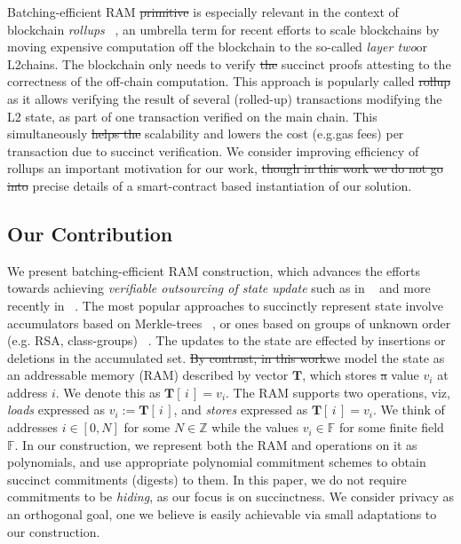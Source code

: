\documentclass[sigconf]{acmart}
\renewcommand{\vec}{\mathbf} %
\newcommand{\vecT}{\vec{T}}
\newcommand{\F}{\mathbb{F}}
\newcommand{\load}{\ensuremath{\mathsf{LD}}}
\newcommand{\store}{\ensuremath{\mathsf{STR}}}
\providecommand{\DIFaddtex}[1]{{\protect\color{blue}\uwave{#1}}} %
\providecommand{\DIFdeltex}[1]{{\protect\color{red}\sout{#1}}}                      %
\providecommand{\DIFaddbegin}{} %
\providecommand{\DIFaddend}{} %
\providecommand{\DIFdelbegin}{} %
\providecommand{\DIFdelend}{} %
\providecommand{\DIFadd}[1]{\texorpdfstring{\DIFaddtex{#1}}{#1}} %
\providecommand{\DIFdel}[1]{\texorpdfstring{\DIFdeltex{#1}}{}} %
\newcommand{\DIFscaledelfig}{0.5}
\newlength{\DIFdelgraphicswidth} %
\newlength{\DIFdelgraphicsheight} %
\newcommand{\DIFaddincludegraphics}[2][]{{\color{blue}\fbox{\DIFOincludegraphics[#1]{#2}}}} %
\newcommand{\DIFdelincludegraphics}[2][]{%
	\sbox{\DIFdelgraphicsbox}{\DIFOincludegraphics[#1]{#2}}%
	\settoboxwidth{\DIFdelgraphicswidth}{\DIFdelgraphicsbox} %
	\settoboxtotalheight{\DIFdelgraphicsheight}{\DIFdelgraphicsbox} %
	\scalebox{\DIFscaledelfig}{%
		\parbox[b]{\DIFdelgraphicswidth}{\usebox{\DIFdelgraphicsbox}\\[-\baselineskip] \rule{\DIFdelgraphicswidth}{0em}}\llap{\resizebox{\DIFdelgraphicswidth}{\DIFdelgraphicsheight}{%
				\setlength{\unitlength}{\DIFdelgraphicswidth}%
				\begin{picture}(1,1)%
					\thicklines\linethickness{2pt} %
					{\color[rgb]{1,0,0}\put(0,0){\framebox(1,1){}}}%
					{\color[rgb]{1,0,0}\put(0,0){\line( 1,1){1}}}%
					{\color[rgb]{1,0,0}\put(0,1){\line(1,-1){1}}}%
				\end{picture}%
			}\hspace*{3pt}}} %
} %
\DeclareRobustCommand{\DIFaddbegin}{\DIFOaddbegin \let\includegraphics\DIFaddincludegraphics} %
\DeclareRobustCommand{\DIFaddend}{\DIFOaddend \let\includegraphics\DIFOincludegraphics} %
\DeclareRobustCommand{\DIFdelbegin}{\DIFOdelbegin \let\includegraphics\DIFdelincludegraphics} %
\DeclareRobustCommand{\DIFdelend}{\DIFOaddend \let\includegraphics\DIFOincludegraphics} %
\begin{document}
	 \DIFaddend Batching-efficient RAM \DIFdelbegin \DIFdel{primitive }\DIFdelend is especially relevant in the context of blockchain {\em rollups} ~\cite{rollup},
	an umbrella term for recent efforts to scale blockchains by moving expensive computation off the blockchain to the so-called {\em layer two}\DIFaddbegin \DIFadd{~(}\DIFaddend or L2\DIFaddbegin \DIFadd{) }\DIFaddend chains. The blockchain only needs to verify \DIFdelbegin \DIFdel{the }\DIFdelend succinct proofs attesting to the correctness of the off-chain computation. This approach is popularly called \DIFdelbegin \DIFdel{rollup }\DIFdelend \DIFaddbegin \textit{\DIFadd{rollup}} \DIFaddend as it allows verifying the result of several (rolled-up) transactions modifying the L2 state, as part of one transaction verified on the main chain.
	This simultaneously \DIFdelbegin \DIFdel{helps the }\DIFdelend \DIFaddbegin \DIFadd{improves }\DIFaddend scalability and lowers the cost (e.g.\DIFaddbegin \DIFadd{, }\DIFaddend gas fees) per transaction due to succinct verification. We consider improving efficiency of rollups an important motivation for our work, \DIFdelbegin \DIFdel{though in this work we do not go into }\DIFdelend \DIFaddbegin \DIFadd{but avoid }\DIFaddend precise details of a smart-contract based
	instantiation of our solution.
	
	\subsection{Our Contribution}\label{subsec:ourwork} 
	We present batching-efficient RAM construction, which advances the efforts
	towards achieving {\em verifiable outsourcing of state update} such as in ~\cite{EPRINT:BFRSBW13}
	and more recently in ~\cite{USENIX:OWWB20, CCS:CFHKKO22}.
	The most popular approaches to succinctly represent
	state involve accumulators based on Merkle-trees ~\cite{C:Merkle87}, or ones based on groups of unknown order
	(e.g. RSA, class-groups) ~\cite{C:CamLys02,C:BonBunFis19,USENIX:OWWB20, CCS:CFHKKO22}.
	The updates to the state are effected by insertions or deletions in the  accumulated set.
	\DIFdelbegin \DIFdel{By contrast, in this work}\DIFdelend \DIFaddbegin \DIFadd{In this work, }\DIFaddend we
	model the state as an addressable memory (RAM) described by vector $\vecT$, which stores \DIFdelbegin \DIFdel{a }\DIFdelend value $v_i$ at address $i$.
	We denote this as $\vecT[\,i\,]=v_i$. The RAM supports two operations, viz, {\em loads} expressed
	as $v_i := \vecT[\,i\,]$, and {\em stores} expressed as $\vecT[\,i\,]=v_i$.
	We think of addresses $i\in [0,N]$ for some $N\in \mathbb{Z}$ while the
	values $v_i\in \F$ for some finite field $\F$. In our construction, we represent both the RAM and operations on it
	as polynomials, and use appropriate polynomial commitment schemes to obtain succinct commitments (digests) to them.
	In this paper, we do not require commitments to be {\em hiding}, as our focus is on succinctness.
	We consider privacy as an orthogonal goal, one we believe is easily achievable
	via small adaptations to our construction.\smallskip
	
\end{document}
